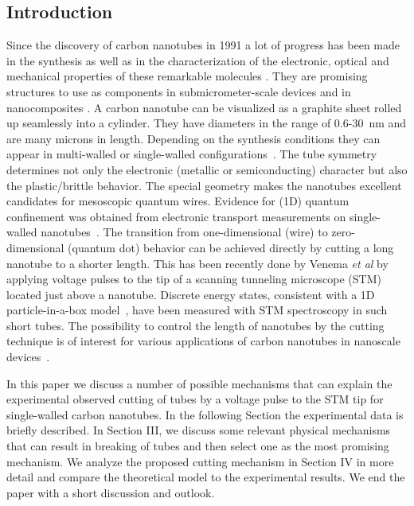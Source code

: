 \begin{multicols}{2}
\narrowtext

\section{Introduction}

Since the discovery of carbon nanotubes in 1991 \cite{Iijima} a
lot of progress has been made in the synthesis as well as in the
characterization of the electronic, optical and mechanical
properties of these remarkable molecules
\cite{book,book1,book2,dekker_pt}. They are promising structures
to use as components in submicrometer-scale devices
\cite{devices,pipe} and in nanocomposites \cite{nanoc}. A carbon
nanotube can be visualized as a graphite sheet rolled up
seamlessly into a cylinder. They have diameters in the range of
0.6-30~nm and are many microns in length. Depending on the
synthesis conditions they can appear in multi-walled or
single-walled configurations~\cite{Iijima,Smalley,Catherine}. The
tube symmetry determines not only the electronic (metallic or
semiconducting) character\cite{book2} but also the plastic/brittle
behavior\cite{Marco,Paul}. The special geometry makes the
nanotubes excellent candidates for mesoscopic quantum wires.
Evidence for (1D) quantum confinement was obtained from electronic
transport measurements on single-walled nanotubes~\cite{Dekker}.
The transition from one-dimensional (wire) to zero-dimensional
(quantum dot) behavior can be achieved directly by cutting a long
nanotube to a shorter length. This has been recently done by
Venema {\it et al}\cite{Venema} by applying voltage pulses to the
tip of a scanning tunneling microscope (STM) located just above a
nanotube. Discrete energy states, consistent with a 1D
particle-in-a-box model~\cite{Venema2,Rubio}, have been measured
with STM spectroscopy in such short tubes\cite{Venema2}. The
possibility to control the length of nanotubes by the cutting
technique is of interest for various applications of carbon
nanotubes in nanoscale devices~\cite{dekker_pt,devices}.


In this paper we discuss a number of possible mechanisms that can
explain the experimental observed cutting of tubes by a voltage
pulse to the STM tip for single-walled carbon nanotubes. In the
following Section the experimental data is briefly described. In
Section III, we discuss some relevant physical mechanisms that can
result in breaking of tubes and then select one as the most
promising mechanism. We analyze  the proposed cutting mechanism in
Section IV in more detail and compare the theoretical model to the
experimental results. We end the paper with a short discussion and
outlook.


\end{multicols}
